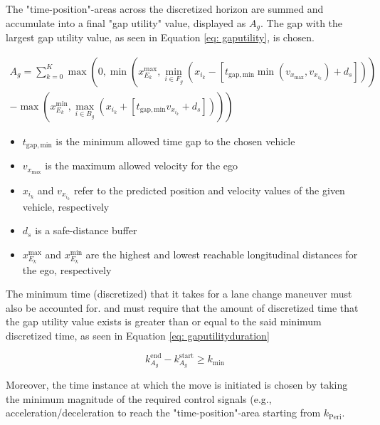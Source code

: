 \documentclass[12pt, a4paper]{report}
\begin{document}
The "time-position"-areas across the discretized horizon are summed and accumulate into a final "gap utility" value, displayed as $A_g$. The gap with the largest gap utility value, as seen in Equation \eqref{eq: gaputility}, is chosen. 

\begin{equation} \label{eq: gaputility}
    \begin{split}
        A_g = \sum\limits^{K}_{k=0}\max\left(0,\min\left(x^{\mathrm{max}}_{E_k},\min\limits_{i \in F_g}(x_{i_k}-[t_{\mathrm{gap,min}}\min(v_{x_{\mathrm{max}}}, v_{x_{i_k}})+d_s])\right) \right. \\
        \left. -\max\left(x^\mathrm{min}_{E_k},\max\limits_{i \in B_g}(x_{i_k}+[t_{\mathrm{gap,min}}v_{x_{i_k}}+d_s])\right)\right)
    \end{split}
\end{equation}

\begin{itemize}
    \item $t_{\mathrm{gap,min}}$ is the minimum allowed time gap to the chosen vehicle
    \item $v_{x_{\mathrm{max}}}$ is the maximum allowed velocity for the ego
    \item $x_{i_k}$ and $v_{x_{i_k}}$ refer to the predicted position and velocity values of the given vehicle, respectively
    \item $d_s$ is a safe-distance buffer
    \item $x^{\mathrm{max}}_{E_k}$ and $x^{\mathrm{min}}_{E_k}$ are the highest and lowest reachable longitudinal distances for the ego, respectively
\end{itemize}

The minimum time (discretized) that it takes for a lane change maneuver must also be accounted for. and must require that the amount of discretized time that the gap utility value exists is greater than or equal to the said minimum discretized time, as seen in Equation \eqref{eq: gaputilityduration}

\begin{equation} \label{eq: gaputilityduration}
    k^{\mathrm{end}}_{A_g}-k^{\mathrm{start}}_{A_g}\geq k_{\mathrm{min}}
\end{equation}

Moreover, the time instance at which the move is initiated is chosen by taking the minimum magnitude of the required control signals (e.g., acceleration/deceleration to reach the "time-position"-area starting from $k_{\mathrm{Peri}}$.
\end{document}
